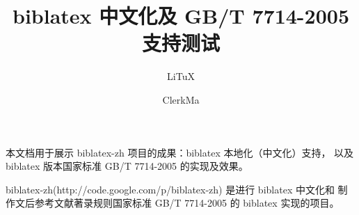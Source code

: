 \documentclass[UTF8]{ctexart}
\title{biblatex 中文化及 GB/T 7714-2005 支持测试}
\author{LiTuX \and ClerkMa}
\begin{document}
\maketitle

本文档用于展示 biblatex-zh 项目的成果：biblatex 本地化（中文化）支持，
以及 biblatex 版本国家标准 GB/T 7714-2005 的实现及效果。

biblatex-zh(http://code.google.com/p/biblatex-zh) 是进行 biblatex 中文化和
制作文后参考文献著录规则国家标准 GB/T 7714-2005 的 biblatex 实现的项目。

\nocite{*}
\printbibliography
\end{document}

